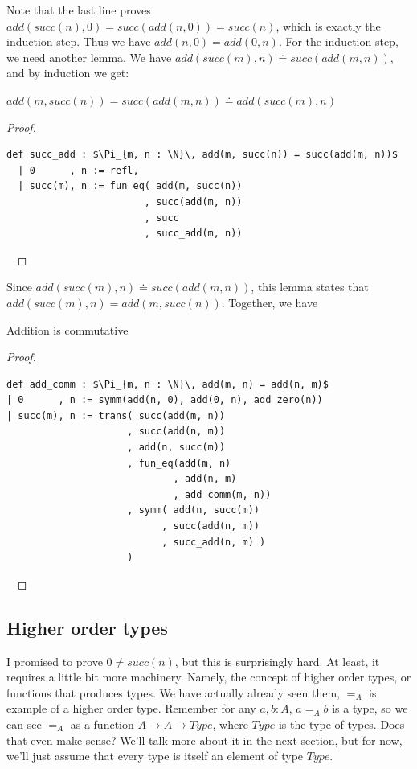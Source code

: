 \documentclass[a4paper, 12pt]{article}
\newcommand{\N}{\mathbb{N}}
\theoremstyle{changedot}
\theoremstyle{changedotbreak}
\theoremstyle{nonumberplain}
\newtheorem{proof}{Proof}
\begin{document}
Note that the last line proves $add(succ(n), 0) = succ(add(n, 0)) = succ(n)$, which is exactly the induction step. Thus we have $add(n, 0) = add(0, n)$. For the induction step, we need another lemma. We have $add(succ(m), n) \doteq succ(add(m, n))$, and by induction we get:

\begin{lemma}
  $add(m, succ(n)) = succ(add(m, n)) \doteq add(succ(m), n)$
\end{lemma}
\begin{proof}~
\begin{lstlisting}[mathescape=true]
  def succ_add : $\Pi_{m, n : \N}\, add(m, succ(n)) = succ(add(m, n))$
  | 0      , n := refl,
  | succ(m), n := fun_eq( add(m, succ(n))
                        , succ(add(m, n))
                        , succ
                        , succ_add(m, n))
\end{lstlisting}~
\end{proof}

Since $add(succ(m), n) \doteq succ(add(m, n))$, this lemma states that $add(succ(m), n) = add(m, succ(n))$. Together, we have
\begin{theorem}\label{thm:add_comm}
  Addition is commutative
\end{theorem}
\begin{proof}~
\begin{lstlisting}[mathescape=true]
def add_comm : $\Pi_{m, n : \N}\, add(m, n) = add(n, m)$
| 0      , n := symm(add(n, 0), add(0, n), add_zero(n))
| succ(m), n := trans( succ(add(m, n))
                     , succ(add(n, m))
                     , add(n, succ(m))
                     , fun_eq(add(m, n)
                             , add(n, m)
                             , add_comm(m, n))
                     , symm( add(n, succ(m))
                           , succ(add(n, m))
                           , succ_add(n, m) )
                     )
\end{lstlisting}~
\end{proof}

\subsection{Higher order types}
I promised to prove $0 \neq succ(n)$, but this is surprisingly hard. At least, it requires a little bit more machinery. Namely, the concept of higher order types, or functions that produces types. We have actually already seen them, $=_{A}$ is example of a higher order type. Remember for any $a, b : A$, $a =_{A} b$ is a type, so we can see $=_{A}$ as a function $A \to A \to \mathit{Type}$, where $\mathit{Type}$ is the type of types. Does that even make sense? We'll talk more about it in the next section, but for now, we'll just assume that every type is itself an element of type $\mathit{Type}$.
\end{document}
